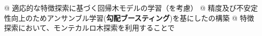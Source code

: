 \begin{tcolorbox}[title={\centering \large アプローチ}]
	\begin{easylist}[itemize]
			@ 適応的な特徴探索に基づく回帰木モデルの学習（を考慮）
			@ 精度及び不安定性向上のためアンサンブル学習({\bf 勾配ブースティング})を基にしたの構築
			@ 特徴探索において、モンテカルロ木探索を利用することで
			 
		\end{easylist}
	\end{tcolorbox}
